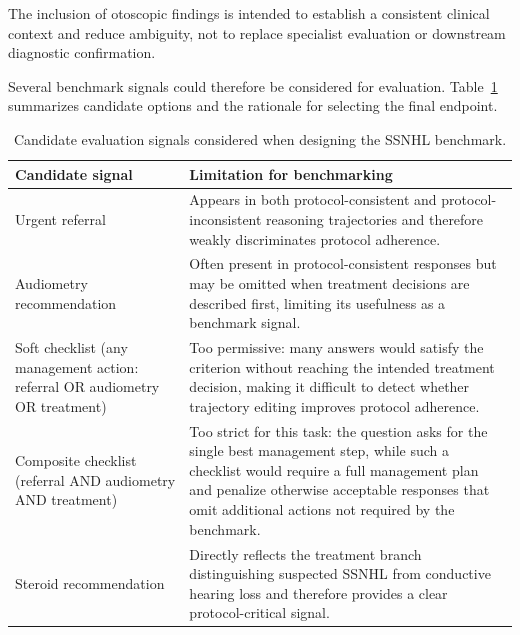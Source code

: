 \documentclass[twocolumn]{article}
\begin{document}
The inclusion of otoscopic findings is intended to establish a consistent
clinical context and reduce ambiguity, not to replace specialist evaluation or
downstream diagnostic confirmation.

Several benchmark signals could therefore be considered for evaluation.
Table~\ref{tab:ssnhl_signals} summarizes candidate options and the rationale for
selecting the final endpoint.

\begin{table}[!htbp]
  \centering
  \renewcommand{\arraystretch}{1.5}
  \begin{tabular}{>{\raggedright\arraybackslash}p{5cm} p{10cm}}
    \toprule
    Candidate signal & Limitation for benchmarking \\
    \midrule

    Urgent referral & Appears in both protocol-consistent and
    protocol-inconsistent reasoning trajectories and therefore weakly
    discriminates protocol adherence. \\

    Audiometry recommendation & Often present in protocol-consistent responses
    but may be omitted when treatment decisions are described first, limiting
    its usefulness as a benchmark signal. \\

    Soft checklist (any management action: referral OR audiometry OR treatment)
    & Too permissive: many answers would satisfy the criterion without reaching
    the intended treatment decision, making it difficult to detect whether
    trajectory editing improves protocol adherence. \\

    Composite checklist (referral AND audiometry AND treatment) & Too strict for
    this task: the question asks for the single best management step, while such
    a checklist would require a full management plan and penalize otherwise
    acceptable responses that omit additional actions not required by the
    benchmark. \\

    Steroid recommendation & Directly reflects the treatment branch
    distinguishing suspected SSNHL from conductive hearing loss and therefore
    provides a clear protocol-critical signal. \\

    \bottomrule
  \end{tabular}
  \caption{Candidate evaluation signals considered when designing the SSNHL
  benchmark.}\label{tab:ssnhl_signals}
\end{table}

\printbibliography[]
\end{document}
